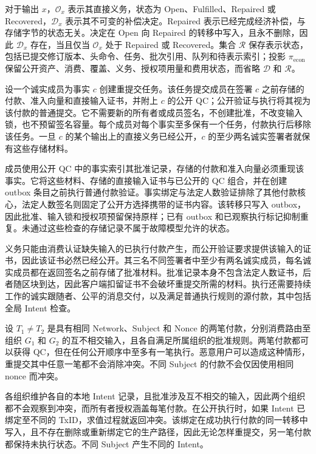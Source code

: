 对于输出 $x$，$\mathcal O_x$ 表示其直接义务，状态为 Open、Fulfilled、Repaired 或 Recovered，$\mathcal D_x$ 表示其不可变的补偿决定。Repaired 表示已经完成经济补偿，与存储字节的状态无关。决定在 Open 向 Repaired 的转移中写入，且永不删除，因此 $\mathcal D_x$ 存在，当且仅当 $\mathcal O_x$ 处于 Repaired 或 Recovered。集合 $\mathcal R$ 保存表示状态，包括已提交修订版本、头命令、任务、批次引用、队列和待表示索引；投影 $\pi_{\mathrm{econ}}$ 保留公开资产、消费、覆盖、义务、授权项用量和费用状态，而省略 $\mathcal D$ 和 $\mathcal R$。

\begin{lemma}[重提交保持授权不变]
\label{lem:security-resubmission}
设一个诚实成员为事实 $c$ 创建重提交任务。该任务提交成员在签署 $c$ 之前存储的付款、准入向量和直接输入证书，并附上 $c$ 的公开 QC；公开验证与执行将其视为该付款的普通提交。它不需要新的所有者或成员签名，不创建批准，不改变输入锁，也不预留签名容量。每个成员对每个事实至多保有一个任务，付款执行后移除该任务。一旦 $c$ 的某个输出上的直接义务已经公开，$c$ 的至少两名诚实签署者就保有这些存储材料。
\end{lemma}
\begin{IEEEproof}
成员使用公开 QC 中的事实索引其批准记录，存储的付款和准入向量必须重现该事实。它将这些材料、存储的直接输入证书与已公开的 QC 组合，并在创建 outbox 条目之前执行普通付款验证。事实绑定与法定人数验证排除了其他付款核心，法定人数签名则固定了公开方选择携带的证书内容。该转移只写入 outbox，因此批准、输入锁和授权项预留保持原样；已有 outbox 和已观察执行标记抑制重复。未通过这些检查的存储记录不属于故障模型允许的状态。

义务只能由消费认证缺失输入的已执行付款产生，而公开验证要求提供该输入的证书，因此该证书必然已经公开。其三名不同签署者中至少有两名诚实成员，每名诚实成员都在返回签名之前存储了批准材料。批准记录本身不包含法定人数证书，后者随区块到达，因此客户端扣留证书不会破坏重提交所需的材料。执行还需要持续工作的诚实跟随者、公平的消息交付，以及满足普通执行规则的源付款，其中包括全局 Intent 检查。
\end{IEEEproof}

\begin{lemma}
\label{lem:security-intent}
设 $T_1\ne T_2$ 是具有相同 Network、Subject 和 Nonce 的两笔付款，分别消费路由至组织 $G_1$ 和 $G_2$ 的互不相交输入，且各自满足所属组织的批准规则。两笔付款都可以获得 QC，但在任何公开顺序中至多有一笔执行。恶意用户可以造成这种情形，重提交其中任意一笔都不会消除冲突。不同 Subject 的付款不会仅因使用相同 nonce 而冲突。
\end{lemma}
\begin{IEEEproof}
各组织维护各自的本地 Intent 记录，且批准涉及互不相交的输入，因此两个组织都不会观察到冲突，而所有者授权涵盖每笔付款。在公开执行时，如果 Intent 已绑定至不同的 TxID，求值过程就返回冲突。该绑定在成功执行付款的同一转移中写入，且不存在删除或重新绑定它的生产路径，因此无论怎样重提交，另一笔付款都保持未执行状态。不同 Subject 产生不同的 Intent。
\end{IEEEproof}

